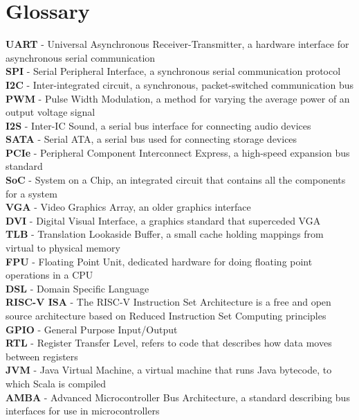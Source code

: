 \documentclass[a4paper,fleqn,12pt]{article}
\begin{document}
\section{Glossary}
\textbf{UART} - Universal Asynchronous Receiver-Transmitter, a hardware interface for asynchronous serial communication\\
\textbf{SPI} - Serial Peripheral Interface, a synchronous serial communication protocol\\
\textbf{I2C} - Inter-integrated circuit, a synchronous, packet-switched communication bus\\
\textbf{PWM} - Pulse Width Modulation, a method for varying the average power of an output voltage signal\\
\textbf{I2S} - Inter-IC Sound, a serial bus interface for connecting audio devices\\
\textbf{SATA} - Serial ATA, a serial bus used for connecting storage devices\\
\textbf{PCIe} - Peripheral Component Interconnect Express, a high-speed expansion bus standard\\
\textbf{SoC} - System on a Chip, an integrated circuit that contains all the components for a system\\
\textbf{VGA} - Video Graphics Array, an older graphics interface\\
\textbf{DVI} - Digital Visual Interface, a graphics standard that superceded VGA\\
\textbf{TLB} - Translation Lookaside Buffer, a small cache holding mappings from virtual to physical memory \\
\textbf{FPU} - Floating Point Unit, dedicated hardware for doing floating point operations in a CPU\\
\textbf{DSL} - Domain Specific Language\\
\textbf{RISC-V ISA} - The RISC-V Instruction Set Architecture is a free and open source architecture based on Reduced Instruction Set Computing principles\\
\textbf{GPIO} - General Purpose Input/Output \\
\textbf{RTL} - Register Transfer Level, refers to code that describes how data moves between registers\\
\textbf{JVM} - Java Virtual Machine, a virtual machine that runs Java bytecode, to which Scala is compiled\\
\textbf{AMBA} - Advanced Microcontroller Bus Architecture, a standard describing bus interfaces for use in microcontrollers\\



\end{document}
